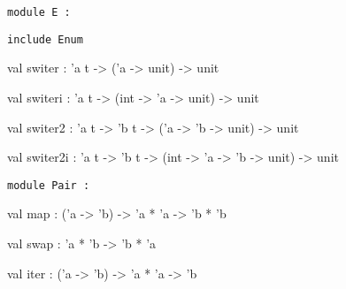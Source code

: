 \documentclass[11pt]{article}
\begin{document}
\begin{ocamldoccode}
{\tt{module }}{\tt{E}}{\tt{ : }}\end{ocamldoccode}
\label{module:Util.E}

\begin{ocamldocsigend}


{\tt{include }}{\tt{Enum}}

\label{val:Util.E.switer}\begin{ocamldoccode}
val switer : 'a t -> ('a -> unit) -> unit
\end{ocamldoccode}


\label{val:Util.E.switeri}\begin{ocamldoccode}
val switeri : 'a t -> (int -> 'a -> unit) -> unit
\end{ocamldoccode}


\label{val:Util.E.switer2}\begin{ocamldoccode}
val switer2 : 'a t -> 'b t -> ('a -> 'b -> unit) -> unit
\end{ocamldoccode}


\label{val:Util.E.switer2i}\begin{ocamldoccode}
val switer2i : 'a t -> 'b t -> (int -> 'a -> 'b -> unit) -> unit
\end{ocamldoccode}
\end{ocamldocsigend}






\begin{ocamldoccode}
{\tt{module }}{\tt{Pair}}{\tt{ : }}\end{ocamldoccode}
\label{module:Util.Pair}

\begin{ocamldocsigend}


\label{val:Util.Pair.map}\begin{ocamldoccode}
val map : ('a -> 'b) -> 'a * 'a -> 'b * 'b
\end{ocamldoccode}


\label{val:Util.Pair.swap}\begin{ocamldoccode}
val swap : 'a * 'b -> 'b * 'a
\end{ocamldoccode}


\label{val:Util.Pair.iter}\begin{ocamldoccode}
val iter : ('a -> 'b) -> 'a * 'a -> 'b
\end{ocamldoccode}
\end{ocamldocsigend}
\end{document}
